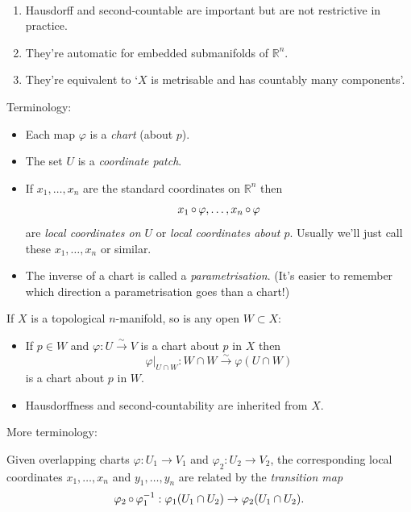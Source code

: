 \documentclass[a4paper,11pt]{article}
\begin{document}
	\begin{rmk} \ 
		\begin{enumerate}
			\item Hausdorff and second-countable are important but are not restrictive in practice.
			\item They're automatic for embedded submanifolds of $\mathbb{R}^n$.
			\item They're equivalent to `$X$ is metrisable and has countably many components'.
		\end{enumerate}
	\end{rmk}

	Terminology:
	\begin{itemize}
		\item Each map $\varphi$ is a \emph{chart} (about $p$).
		\item The set $U$ is a \emph{coordinate patch}.
		\item If $x_1, \dots, x_n$ are the standard coordinates on $\mathbb{R}^n$ then
		\[
			x_1 \operatorname{\circ} \varphi, \dots , x_n \operatorname{\circ} \varphi
		\]
		are \emph{local coordinates on $U$} or \emph{local coordinates about $p$}. Usually we'll just call these $x_1, \dots , x_n$ or similar.
		\item The inverse of a chart is called a \emph{parametrisation}. (It's easier to remember which direction a parametrisation goes than a chart!)
	\end{itemize}

	\begin{ex}
		If $X$ is a topological $n$-manifold, so is any open $W \subset X$:
		\begin{itemize}
			\item If $p \in W$ and $\varphi: U \xrightarrow{\sim} V$ is a chart about $p$ in $X$ then \[
				\varphi|_{U \cap W}: W \cap W \xrightarrow{\sim} \varphi(U \cap W)
			\]
			is a chart about $p$ in $W$.
			\item Hausdorffness and second-countability are inherited from $X$.
		\end{itemize}
	\end{ex}

	More terminology:

	Given overlapping charts $\varphi: U_1 \to V_1$ and $\varphi_2 : U_2 \to V_2$, the corresponding local coordinates $x_1, \dots , x_n$ and $y_1, \dots, y_n$ are related by the \emph{transition map}
	\[
		\varphi_2 \operatorname{\circ} \varphi_1^{-1} : \varphi_1 (U_1 \cap U_2) \to \varphi_2 (U_1 \cap U_2).
	\]
\end{document}
